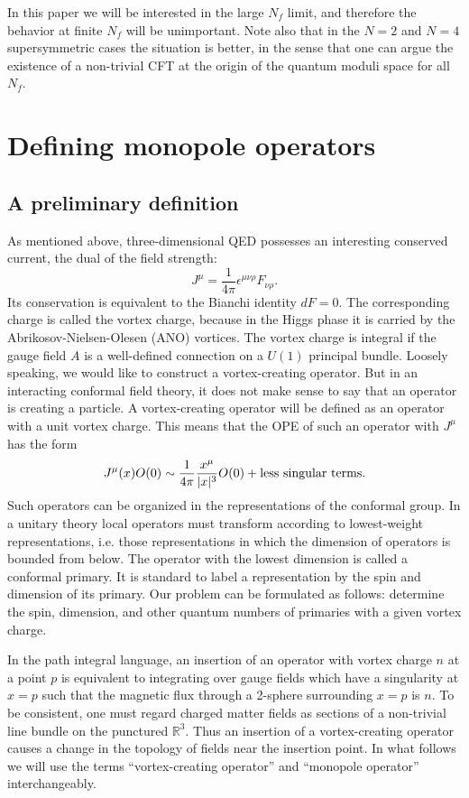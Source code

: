 \documentclass[a4paper,12pt, amsfonts, amssymb]{article}
\newcommand{\RR}{{\mathbb R}}
\newcommand{\eps}{\epsilon}
\begin{document}
In this paper we will be
interested in the large $N_f$ limit, and therefore the behavior at
finite $N_f$ will be unimportant. Note also that in the $N=2$ and $N=4$
supersymmetric cases the situation is better, in the sense that one can argue
the existence of a non-trivial CFT at the origin of the quantum moduli
space for all $N_f$. 

\section{Defining monopole operators}

\subsection{A preliminary definition}

As mentioned above, three-dimensional QED possesses an interesting conserved current, the dual of the field strength:
$$
J^\mu=\frac{1}{4\pi}\eps^{\mu\nu\rho} F_{\nu\rho}.
$$
Its conservation is equivalent to the Bianchi identity $dF=0.$
The corresponding charge is called the vortex charge, because in the
Higgs phase it is carried by the Abrikosov-Nielsen-Olesen (ANO)
vortices. The vortex charge is integral if the gauge field $A$ is
a well-defined connection on a $U(1)$ principal bundle. Loosely speaking,
we would like to construct a vortex-creating operator. 
But in an interacting conformal field theory, 
it does not make sense to say that an 
operator is creating a particle. A vortex-creating operator will 
be defined as an operator with a unit vortex charge. This means that the
OPE of such an operator with $J^\mu$ has the form
$$
J^\mu(x) O(0)\sim \frac{1}{4\pi}\frac{x^\mu}{|x|^3} O(0)+
{\rm less\ singular\ terms}.
$$
Such operators can be organized in the representations of the conformal
group. In a unitary theory local operators must transform
according to lowest-weight representations, i.e.
those representations in which the dimension of operators is bounded
from below. The operator with the lowest dimension is called a conformal
primary. It is standard to label a representation by the spin and dimension 
of its primary. Our problem can be formulated
as follows: determine the spin, dimension, and other quantum numbers
of primaries with a given vortex charge.

In the path integral language, an insertion of an operator with vortex
charge $n$ at a point $p$ is equivalent to integrating
over gauge fields which have a singularity at $x=p$ such that
the magnetic flux through a 2-sphere surrounding $x=p$ is $n$.
To be consistent, one must regard charged matter fields as sections
of a non-trivial line bundle on the punctured $\RR^3.$ Thus
an insertion of a vortex-creating operator causes a change in the topology
of fields near the insertion point. In what follows we will use the
terms ``vortex-creating operator'' and ``monopole operator'' 
interchangeably.
\end{document}
